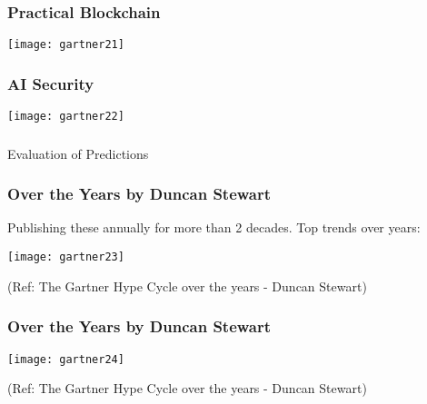 \begin{frame}[fragile]\frametitle{Practical Blockchain}
\begin{center}
\texttt{[image: gartner21]}
\end{center}
\end{frame}

\begin{frame}[fragile]\frametitle{AI Security}
\begin{center}
\texttt{[image: gartner22]}
\end{center}
\end{frame}

\begin{frame}[fragile]\frametitle{}
\begin{center}
{\Large Evaluation of Predictions}
\end{center}
\end{frame}

\begin{frame}[fragile]\frametitle{Over the Years by Duncan Stewart}

Publishing these annually for more than 2 decades. Top trends over years:

\begin{center}
\texttt{[image: gartner23]}
\end{center}


{\tiny (Ref: The Gartner Hype Cycle over the years - Duncan Stewart)}

\end{frame}

\begin{frame}[fragile]\frametitle{Over the Years by Duncan Stewart}

\begin{center}
\texttt{[image: gartner24]}
\end{center}


{\tiny (Ref: The Gartner Hype Cycle over the years - Duncan Stewart)}

\end{frame}

